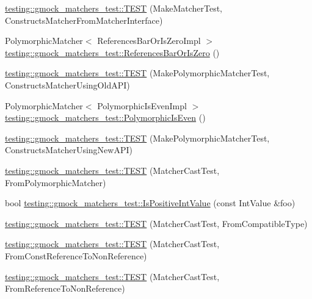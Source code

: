 \begin{DoxyCompactItemize}
\item 
\hyperlink{namespacetesting_1_1gmock__matchers__test_ae433e93168010d7316b40ef4a5088d09}{testing\+::gmock\+\_\+matchers\+\_\+test\+::\+T\+E\+ST} (Make\+Matcher\+Test, Constructs\+Matcher\+From\+Matcher\+Interface)
\item 
Polymorphic\+Matcher$<$ References\+Bar\+Or\+Is\+Zero\+Impl $>$ \hyperlink{namespacetesting_1_1gmock__matchers__test_ac07376a5dff45a905b7eb96e621ce3aa}{testing\+::gmock\+\_\+matchers\+\_\+test\+::\+References\+Bar\+Or\+Is\+Zero} ()
\item 
\hyperlink{namespacetesting_1_1gmock__matchers__test_aad0604e47fea147ae133d134b4606a26}{testing\+::gmock\+\_\+matchers\+\_\+test\+::\+T\+E\+ST} (Make\+Polymorphic\+Matcher\+Test, Constructs\+Matcher\+Using\+Old\+A\+PI)
\item 
Polymorphic\+Matcher$<$ Polymorphic\+Is\+Even\+Impl $>$ \hyperlink{namespacetesting_1_1gmock__matchers__test_a8a0035a0de2d219d89ff7070762ece72}{testing\+::gmock\+\_\+matchers\+\_\+test\+::\+Polymorphic\+Is\+Even} ()
\item 
\hyperlink{namespacetesting_1_1gmock__matchers__test_a619d872aa86419c5093327f64c466df3}{testing\+::gmock\+\_\+matchers\+\_\+test\+::\+T\+E\+ST} (Make\+Polymorphic\+Matcher\+Test, Constructs\+Matcher\+Using\+New\+A\+PI)
\item 
\hyperlink{namespacetesting_1_1gmock__matchers__test_afffaa6f2c436edb7c46e7a16ed2de825}{testing\+::gmock\+\_\+matchers\+\_\+test\+::\+T\+E\+ST} (Matcher\+Cast\+Test, From\+Polymorphic\+Matcher)
\item 
bool \hyperlink{namespacetesting_1_1gmock__matchers__test_a68565741c989968637db5a9e10e55020}{testing\+::gmock\+\_\+matchers\+\_\+test\+::\+Is\+Positive\+Int\+Value} (const Int\+Value \&foo)
\item 
\hyperlink{namespacetesting_1_1gmock__matchers__test_aa7a28536a6c59d56bbbbdb4fa5ba9e4d}{testing\+::gmock\+\_\+matchers\+\_\+test\+::\+T\+E\+ST} (Matcher\+Cast\+Test, From\+Compatible\+Type)
\item 
\hyperlink{namespacetesting_1_1gmock__matchers__test_a9d25aac0defd9296bf207cacd342aff0}{testing\+::gmock\+\_\+matchers\+\_\+test\+::\+T\+E\+ST} (Matcher\+Cast\+Test, From\+Const\+Reference\+To\+Non\+Reference)
\item 
\hyperlink{namespacetesting_1_1gmock__matchers__test_a4bb3955a1e0b603c0156c98a2dc49eea}{testing\+::gmock\+\_\+matchers\+\_\+test\+::\+T\+E\+ST} (Matcher\+Cast\+Test, From\+Reference\+To\+Non\+Reference)
\item 

\end{DoxyCompactItemize}
